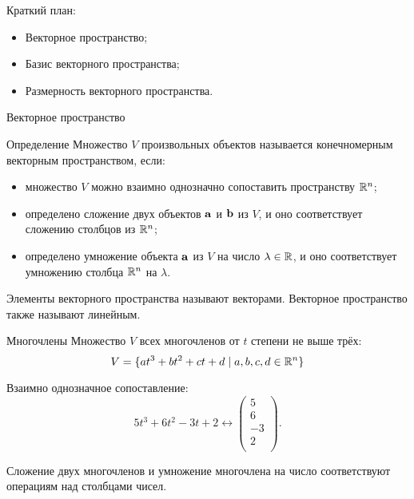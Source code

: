 
\begin{frame} %


\end{frame}



\begin{frame}{Краткий план:}
  \begin{itemize}[<+->]
    \item Векторное пространство;
    \item Базис векторного пространства;
    \item Размерность векторного пространства.
  \end{itemize}

\end{frame}


\begin{frame}{Векторное пространство}

\begin{block}{Определение} 
Множество $V$ произвольных объектов называется \alert{конечномерным векторным пространством}, если:

\begin{itemize}[<+->]
\item множество $V$ можно взаимно однозначно сопоставить пространству $\mathbb{R}^n$;
\item определено сложение двух объектов $\mathbf{a}$ и $\mathbf{b}$ из $V$, 
и оно соответствует сложению столбцов из $\mathbb{R}^n$;
\item определено умножение объекта $\mathbf{a}$ из $V$ на число $\lambda\in \mathbb{R}$, 
и оно соответствует умножению столбца $\mathbb{R}^n$ на $\lambda$.
\end{itemize}
\end{block}

Элементы векторного пространства называют \alert{векторами}. 
\pause
Векторное пространство также называют \alert{линейным}.

\end{frame}



\begin{frame}{Многочлены}
Множество $V$ всех многочленов от $t$ степени не выше трёх:
\[
V  = \{ at^3 + bt^2 + ct + d \mid a, b, c, d \in \mathbb{R}^n \}
\]

\pause
Взаимно однозначное сопоставление: 
\[5t^3 + 6t^2 - 3t + 2 \leftrightarrow \begin{pmatrix} 
    5 \\
    6 \\
    -3 \\
    2 \\
\end{pmatrix}.
\]
\pause


Сложение двух многочленов и умножение многочлена на число соответствуют операциям над столбцами чисел.
\end{frame}




